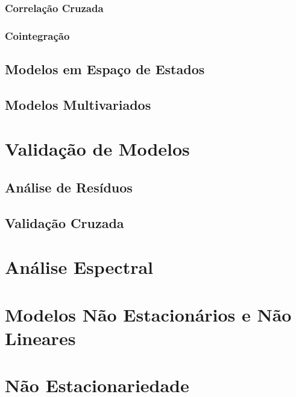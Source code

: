 \subsection{Correlação Cruzada}

\subsection{Cointegração}

\section{Modelos em Espaço de Estados}

\section{Modelos Multivariados}

\chapter{Validação de Modelos}

\section{Análise de Resíduos}
\label{sec:residual_analysis}

\section{Validação Cruzada}

\chapter{Análise Espectral}

\chapter{Modelos Não Estacionários e Não Lineares}
\label{chap:non_stationary_non_linear}


\chapter{Não Estacionariedade}
